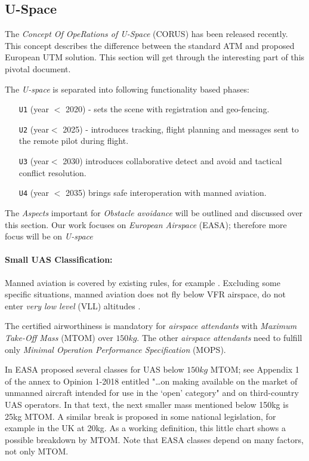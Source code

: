 \subsection{U-Space}\label{sec:USpace}

\noindent The \emph{Concept Of OpeRations of U-Space} (CORUS) \cite{corus2018} has been released recently. This concept describes the difference between the standard ATM and proposed European UTM solution. This section will get through the interesting part of this pivotal document.

\noindent The \emph{U-space} is separated into following functionality based phases:
\begin{itemize}
    \item[\texttt{U1}] (year $<$ 2020) - sets the scene with registration and geo-fencing.
    
    \item[\texttt{U2}] (year$<$ 2025) - introduces tracking, flight planning and messages sent to the remote pilot during flight.
    
    \item[\texttt{U3}] (year$<$ 2030) introduces collaborative detect and avoid and tactical conflict resolution.
    
    \item[\texttt{U4}] (year $<$ 2035) brings safe interoperation with manned aviation.
\end{itemize}

The \emph{Aspects} important for \emph{Obstacle avoidance} will be outlined and discussed over this section. Our work focuses on \emph{European Airspace} (EASA); therefore more focus will be on \emph{U-space}

\paragraph{Small UAS Classification:} Manned aviation is covered by existing rules, for example \cite{icaoAnnex2,ec201208ref5}. Excluding some specific situations, manned aviation does not fly below VFR airspace, do not enter \emph{very low level} (VLL) altitudes \cite{ec200802ref4}. 

The certified airworthiness is mandatory for \emph{airspace attendants} with \emph{Maximum Take-Off Mass} (MTOM) over $150 kg$. The other \emph{airspace attendants} need to fulfill only \emph{Minimal Operation Performance Specification} (MOPS). 

In \cite{easa201801op} EASA proposed several classes for UAS below $150kg$ MTOM; see Appendix 1 of the annex to Opinion 1-2018 entitled "…on making available on the market of unmanned aircraft intended for use in the ‘open’ category" and on third-country UAS operators. In that text, the next smaller mass mentioned below 150kg is 25kg MTOM. A similar break is proposed in some national legislation, for example in the UK at 20kg. As a working definition, this little chart shows a possible breakdown by MTOM. Note
that EASA classes depend on many factors, not only MTOM.

